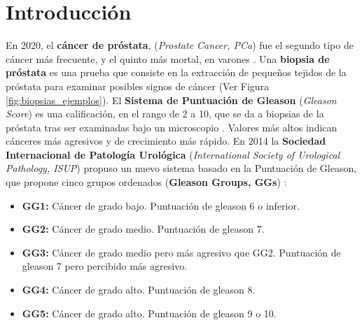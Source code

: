 \newpage
\chapter{Introducción}

En 2020, el \textbf{cáncer de próstata}, (\textit{Prostate Cancer, PCa}) fue el segundo tipo de cáncer más frecuente, y el quinto más mortal, en varones \cite{GlobalCancer}. Una \textbf{biopsia de próstata} es una prueba que consiste en la extracción de pequeños tejidos de la próstata para examinar posibles signos de cáncer (Ver Figura \ref{fig:biopsias_ejemplos}). El \textbf{Sistema de Puntuación de Gleason} (\textit{Gleason Score}) es una calificación, en el rango de 2 a 10, que se da a biopsias de la próstata tras ser examinadas bajo un microscopio \cite{GleasonGov}. Valores más altos indican cánceres más agresivos y de crecimiento más rápido. En 2014 la \textbf{Sociedad Internacional de Patología Urológica} (\textit{International Society of Urological Pathology, ISUP}) propuso un nuevo sistema basado en la Puntuación de Gleason, que propone cinco grupos ordenados (\textbf{Gleason Groups, GGs}) \cite{ISUP2014Disc}:
\begin{itemize}
\item \textbf{GG1: } Cáncer de grado bajo. Puntuación de gleason 6 o inferior.
\item \textbf{GG2: } Cáncer de grado medio. Puntuación de gleason 7.
\item \textbf{GG3: } Cáncer de grado medio pero más agresivo que GG2. Puntuación de gleason 7 pero percibido más agresivo.
\item \textbf{GG4: } Cáncer de grado alto. Puntuación de gleason 8.
\item \textbf{GG5: } Cáncer de grado alto. Puntuación de gleason 9 o 10.
\end{itemize}

